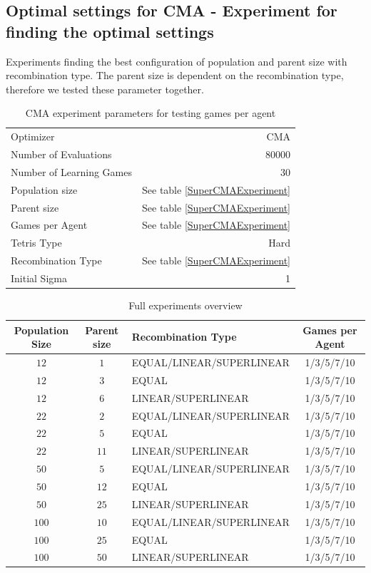 \subsection{Optimal settings for CMA - Experiment for finding the optimal settings \label{appendixCMAPopulationParent}}
Experiments finding the best configuration of population and parent size with recombination type. The parent size is dependent on the recombination type, therefore we tested these parameter together.
\begin{table}[h]
\centering
\begin{tabular}{l r}
Optimizer & CMA\\
Number of Evaluations & 80000\\
Number of Learning Games &30\\
Population size& See table \ref{SuperCMAExperiment}\\
Parent size & See table \ref{SuperCMAExperiment}\\
Games per Agent & See table \ref{SuperCMAExperiment}\\
Tetris Type & Hard\\
\hline
Recombination Type & See table \ref{SuperCMAExperiment}\\
Initial Sigma & 1
\end{tabular}
\caption{CMA experiment parameters for testing games per agent}
\end{table}

\begin{table}[H]
\centering
\begin{tabular}{c c l c}
Population Size & Parent size & Recombination Type & Games per Agent\\
\hline
$12$ & $1$ & EQUAL/LINEAR/SUPERLINEAR & 1/3/5/7/10\\
$12$ & $3$ & EQUAL & 1/3/5/7/10\\
$12$ & $6$ & LINEAR/SUPERLINEAR & 1/3/5/7/10\\
$22$ & $2$ & EQUAL/LINEAR/SUPERLINEAR & 1/3/5/7/10\\
$22$ & $5$ & EQUAL & 1/3/5/7/10\\
$22$ & $11$ & LINEAR/SUPERLINEAR & 1/3/5/7/10\\
$50$ & $5$ & EQUAL/LINEAR/SUPERLINEAR & 1/3/5/7/10\\
$50$ & $12$ & EQUAL & 1/3/5/7/10\\
$50$ & $25$ & LINEAR/SUPERLINEAR & 1/3/5/7/10\\
$100$ & $10$ & EQUAL/LINEAR/SUPERLINEAR & 1/3/5/7/10\\
$100$ & $25$ & EQUAL & 1/3/5/7/10\\
$100$ & $50$ & LINEAR/SUPERLINEAR & 1/3/5/7/10
\end{tabular}
\caption{Full experiments overview \label{SuperCMAExperimentAppendix}}
\end{table}


